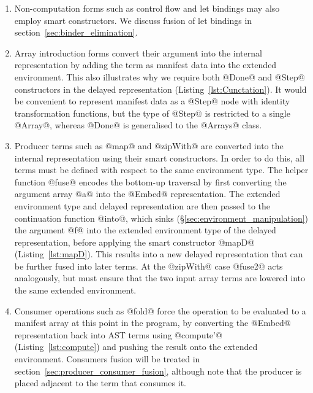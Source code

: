 \begin{enumerate}
\item Non-computation forms such as control flow and let bindings may also
    employ smart constructors. We discuss fusion of let bindings in
    section~\ref{sec:binder_elimination}.

\item Array introduction forms convert their argument into the internal
    representation by adding the term as manifest data into the extended
    environment. This also illustrates why we require both @Done@ and @Step@
    constructors in the delayed representation (Listing~\ref{lst:Cunctation}).
    It would be convenient to represent manifest data as a @Step@ node with
    identity transformation functions, but the type of @Step@ is restricted to a
    single @Array@, whereas @Done@ is generalised to the @Arrays@ class.

\item Producer terms such as @map@ and @zipWith@ are converted into the internal
    representation using their smart constructors. In order to do this, all
    terms must be defined with respect to the same environment type. The helper
    function @fuse@ encodes the bottom-up traversal by first converting the
    argument array @a@ into the @Embed@ representation. The extended environment
    type and delayed representation are then passed to the continuation function
    @into@, which sinks (\S\ref{sec:environment_manipulation}) the argument @f@
    into the extended environment type of the delayed representation, before
    applying the smart constructor @mapD@ (Listing~\ref{lst:mapD}). This results
    into a new delayed representation that can be further fused into later
    terms. At the @zipWith@ case @fuse2@ acts analogously, but must ensure that
    the two input array terms are lowered into the same extended environment.

\item Consumer operations such as @fold@ force the operation to be evaluated to
    a manifest array at this point in the program, by converting the @Embed@
    representation back into AST terms using @compute'@
    (Listing~\ref{lst:compute}) and pushing the result onto the extended
    environment. Consumers fusion will be treated in
    section~\ref{sec:producer_consumer_fusion}, although note that the producer
    is placed adjacent to the term that consumes it.

\end{enumerate}

